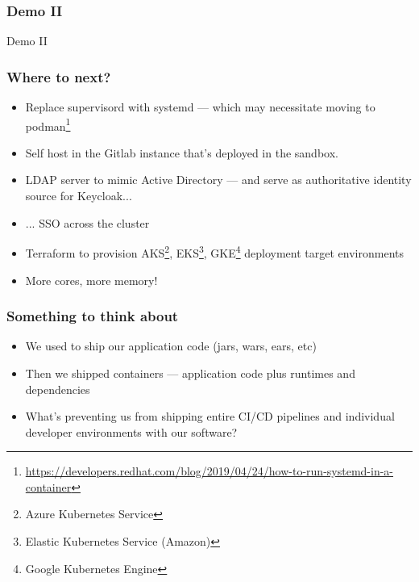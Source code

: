     \begin{frame}
      \frametitle{Demo II}
      \begin{center}
        {\Huge Demo II}
      \end{center}
    \end{frame}

    \begin{frame}
      \frametitle{Where to next?}
      \begin{itemize}
        \item<2->Replace supervisord with systemd --- which may necessitate
          moving to podman\footnote<2->{\href{https://developers.redhat.com/blog/2019/04/24/how-to-run-systemd-in-a-container}{https://developers.redhat.com/blog/2019/04/24/how-to-run-systemd-in-a-container}}
        \item<3->Self host in the Gitlab instance that's deployed in the sandbox.
        \item<4->LDAP server to mimic Active Directory --- and serve as
          authoritative identity source for Keycloak...
        \item<5->... SSO across the cluster
        \item<6->Terraform to provision AKS\footnote<6->{Azure Kubernetes Service},
          EKS\footnote<6->{Elastic Kubernetes Service (Amazon)}, GKE\footnote<6->{Google
            Kubernetes Engine} deployment target environments
        \item<7->More cores, more memory!
      \end{itemize}
    \end{frame}

    \begin{frame}
      \frametitle{Something to think about}
      \begin{itemize}
      \item<2->We used to ship our application code (jars, wars, ears, etc)
      \item<3->Then we shipped containers --- application code plus runtimes and dependencies
      \item<4->What's preventing us from shipping entire CI/CD pipelines and
        individual developer environments with our software?
      \end{itemize}
    \end{frame}

